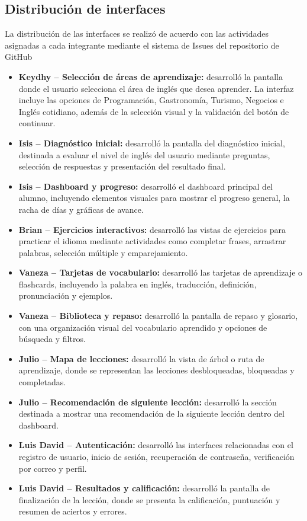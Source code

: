 \subsection{Distribución de interfaces}
La distribución de las interfaces se realizó de acuerdo con las actividades asignadas a cada integrante mediante el sistema de Issues del repositorio de GitHub
\begin{itemize}
\item \textbf{Keydhy -- Selección de áreas de aprendizaje:} desarrolló la pantalla donde el usuario selecciona el área de inglés que desea aprender. La interfaz incluye las opciones de Programación, Gastronomía, Turismo, Negocios e Inglés cotidiano, además de la selección visual y la validación del botón de continuar.
\item \textbf{Isis -- Diagnóstico inicial:} desarrolló la pantalla del diagnóstico inicial, destinada a evaluar el nivel de inglés del usuario mediante preguntas, selección de respuestas y presentación del resultado final.
\item \textbf{Isis -- Dashboard y progreso:} desarrolló el dashboard principal del alumno, incluyendo elementos visuales para mostrar el progreso general, la racha de días y gráficas de avance.
\item \textbf{Brian -- Ejercicios interactivos:} desarrolló las vistas de ejercicios para practicar el idioma mediante actividades como completar frases, arrastrar palabras, selección múltiple y emparejamiento.
\item \textbf{Vaneza -- Tarjetas de vocabulario:} desarrolló las tarjetas de aprendizaje o flashcards, incluyendo la palabra en inglés, traducción, definición, pronunciación y ejemplos.
\item \textbf{Vaneza -- Biblioteca y repaso:} desarrolló la pantalla de repaso y glosario, con una organización visual del vocabulario aprendido y opciones de búsqueda y filtros.
\item \textbf{Julio -- Mapa de lecciones:} desarrolló la vista de árbol o ruta de aprendizaje, donde se representan las lecciones desbloqueadas, bloqueadas y completadas.
\item \textbf{Julio 
-- Recomendación de siguiente lección:} desarrolló la sección destinada a mostrar una recomendación de la siguiente lección dentro del dashboard.
\item \textbf{Luis David -- Autenticación:} desarrolló las interfaces relacionadas con el registro de usuario, inicio de sesión, recuperación de contraseña, verificación por correo y perfil.
\item \textbf{Luis David -- Resultados y calificación:} desarrolló la pantalla de finalización de la lección, donde se presenta la calificación, puntuación y resumen de aciertos y errores.
\end{itemize}
